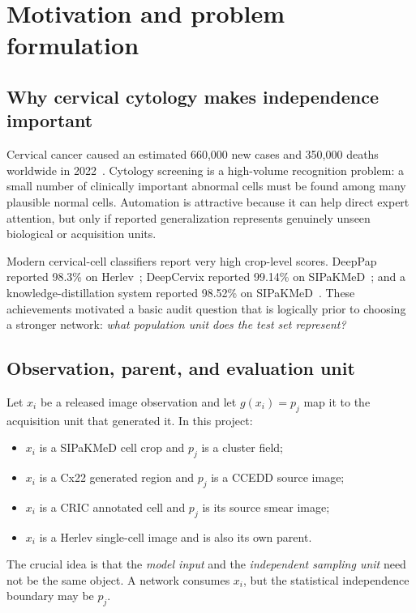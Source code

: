 \chapter{Motivation and problem formulation}\label{s1:ch:ch02_motivation_and_problem_formulation}

\section{Why cervical cytology makes independence important}

Cervical cancer caused an estimated 660,000 new cases and 350,000 deaths worldwide in 2022~\cite{who2025hpv}. Cytology screening is a high-volume recognition problem: a small number of clinically important abnormal cells must be found among many plausible normal cells. Automation is attractive because it can help direct expert attention, but only if reported generalization represents genuinely unseen biological or acquisition units.

Modern cervical-cell classifiers report very high crop-level scores. DeepPap reported 98.3\% on Herlev~\cite{zhang2017deeppap}; DeepCervix reported 99.14\% on SIPaKMeD~\cite{rahaman2021deepcervix}; and a knowledge-distillation system reported 98.52\% on SIPaKMeD~\cite{gao2022knowledge}. These achievements motivated a basic audit question that is logically prior to choosing a stronger network: \emph{what population unit does the test set represent?}

\section{Observation, parent, and evaluation unit}

Let $x_i$ be a released image observation and let $g(x_i)=p_j$ map it to the acquisition unit that generated it. In this project:
\begin{itemize}
  \item $x_i$ is a SIPaKMeD cell crop and $p_j$ is a cluster field;
  \item $x_i$ is a Cx22 generated region and $p_j$ is a CCEDD source image;
  \item $x_i$ is a CRIC annotated cell and $p_j$ is its source smear image;
  \item $x_i$ is a Herlev single-cell image and is also its own parent.
\end{itemize}

The crucial idea is that the \emph{model input} and the \emph{independent sampling unit} need not be the same object. A network consumes $x_i$, but the statistical independence boundary may be $p_j$.

